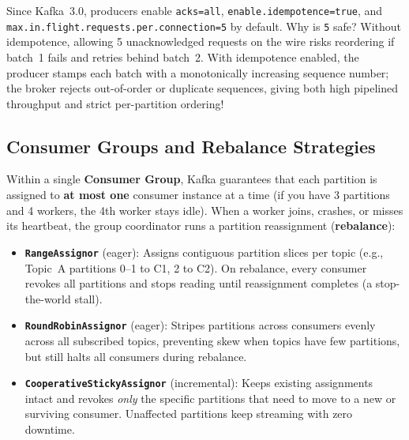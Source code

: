 Since Kafka~3.0, producers enable \texttt{acks=all}, \texttt{enable.idempotence=true}, and \texttt{max.in.flight.requests.per.connection=5} by default. Why is \texttt{5} safe? Without idempotence, allowing 5 unacknowledged requests on the wire risks reordering if batch~1 fails and retries behind batch~2. With idempotence enabled, the producer stamps each batch with a monotonically increasing sequence number; the broker rejects out-of-order or duplicate sequences, giving both high pipelined throughput and strict per-partition ordering!

\subsection{Consumer Groups and Rebalance Strategies}

Within a single \textbf{Consumer Group}, Kafka guarantees that each partition is assigned to \textbf{at most one} consumer instance at a time (if you have 3 partitions and 4 workers, the 4th worker stays idle). When a worker joins, crashes, or misses its heartbeat, the group coordinator runs a partition reassignment (\textbf{rebalance}):
\begin{itemize}[leftmargin=18pt]
  \item \textbf{\texttt{RangeAssignor}} (eager): Assigns contiguous partition slices per topic (e.g., Topic~A partitions 0--1 to C1, 2 to C2). On rebalance, every consumer revokes all partitions and stops reading until reassignment completes (a stop-the-world stall).
  \item \textbf{\texttt{RoundRobinAssignor}} (eager): Stripes partitions across consumers evenly across all subscribed topics, preventing skew when topics have few partitions, but still halts all consumers during rebalance.
  \item \textbf{\texttt{CooperativeStickyAssignor}} (incremental): Keeps existing assignments intact and revokes \emph{only} the specific partitions that need to move to a new or surviving consumer. Unaffected partitions keep streaming with zero downtime.
\end{itemize}

